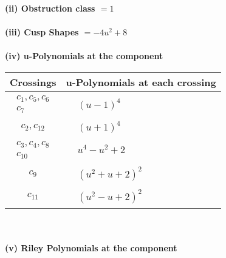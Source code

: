 \documentclass[1p]{elsarticle_modified}
\theoremstyle{definition}
\begin{document}
\flushleft \textbf{(ii) Obstruction class $= 1$}\\~\\
\flushleft \textbf{(iii) Cusp Shapes $= -4 u^2+8$}\\~\\
\newpage\renewcommand{\arraystretch}{1}
\flushleft \textbf{(iv) u-Polynomials at the component}\newline \\
\begin{tabular}{m{50pt}|m{274pt}}
Crossings & \hspace{64pt}u-Polynomials at each crossing \\
\hline $$\begin{aligned}c_{1},c_{5},c_{6}\\c_{7}\end{aligned}$$&$\begin{aligned}
&(u-1)^4
\end{aligned}$\\
\hline $$\begin{aligned}c_{2},c_{12}\end{aligned}$$&$\begin{aligned}
&(u+1)^4
\end{aligned}$\\
\hline $$\begin{aligned}c_{3},c_{4},c_{8}\\c_{10}\end{aligned}$$&$\begin{aligned}
&u^4- u^2+2
\end{aligned}$\\
\hline $$\begin{aligned}c_{9}\end{aligned}$$&$\begin{aligned}
&(u^2+u+2)^2
\end{aligned}$\\
\hline $$\begin{aligned}c_{11}\end{aligned}$$&$\begin{aligned}
&(u^2- u+2)^2
\end{aligned}$\\
\hline
\end{tabular}\\~\\
\newpage\renewcommand{\arraystretch}{1}
\flushleft \textbf{(v) Riley Polynomials at the component}\newline \\
\end{document}
